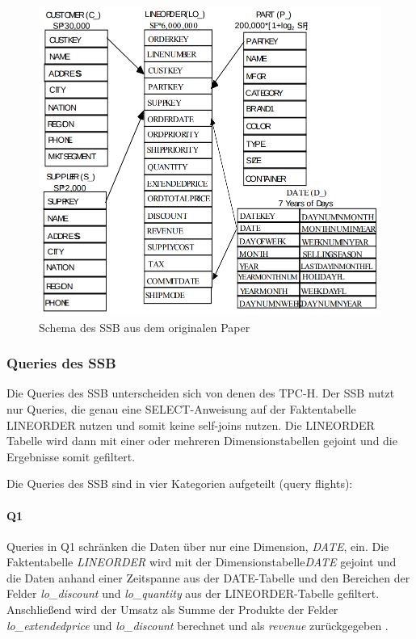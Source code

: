 \begin{figure}[ht]  %
    \centering      %
    \includegraphics[width=1\textwidth]{pictures/ssb/ssb-schema.png}
    \caption{Schema des \ac{SSB} aus dem originalen Paper~\cite{oneil_star_2009}}      %
    \label{pic:ssb-schema}    %
\end{figure}


\subsubsection{Queries des \ac{SSB}}
Die Queries des \ac{SSB} unterscheiden sich von denen des \ac{TPC-H}.
Der \ac{SSB} nutzt nur Queries, die genau eine SELECT-Anweisung auf der Faktentabelle LINEORDER nutzen und somit keine self-joins nutzen. %
Die LINEORDER Tabelle wird dann mit einer oder mehreren Dimensionstabellen gejoint und die Ergebnisse somit gefiltert. 

Die Queries des \ac{SSB} sind in vier Kategorien aufgeteilt (query flights): %


\paragraph{Q1}
Queries in Q1 schränken die Daten über nur eine Dimension, \emph{DATE}, ein.
Die Faktentabelle \emph{LINEORDER} wird mit der Dimensionstabelle\emph{DATE} gejoint und die Daten anhand einer Zeitspanne aus der DATE-Tabelle und den Bereichen der Felder \emph{lo\_discount} und \emph{lo\_quantity} aus der LINEORDER-Tabelle gefiltert.
Anschließend wird der Umsatz als Summe der Produkte der Felder \emph{lo\_extendedprice} und \emph{lo\_discount} berechnet und als \emph{revenue} zurückgegeben \cite{oneil_star_2009}.


